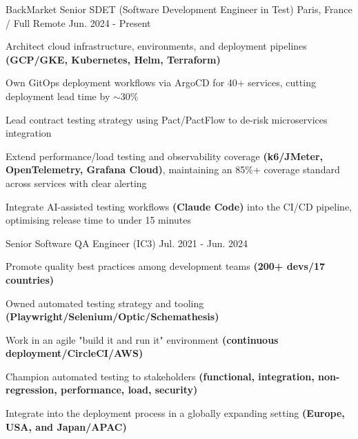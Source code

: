 
\begin{cventries}

  \cventry
  {BackMarket }
  {Senior SDET (Software Development Engineer in Test)}
  {Paris, France / Full Remote}
  {Jun. 2024 - Present}
  {
    \begin{cvitems}
      \item{Architect cloud infrastructure, environments, and deployment pipelines \textbf{(GCP/GKE, Kubernetes, Helm, Terraform)}}
      \item{Own GitOps deployment workflows via ArgoCD for 40+ services, cutting deployment lead time by $\sim$30\%}
      \item{Lead contract testing strategy using Pact/PactFlow to de-risk microservices integration}
      \item{Extend performance/load testing and observability coverage \textbf{(k6/JMeter, OpenTelemetry, Grafana Cloud)}, maintaining an 85\%+ coverage standard across services with clear alerting}
      \item{Integrate AI-assisted testing workflows \textbf{(Claude Code)} into the CI/CD pipeline, optimising release time to under 15 minutes}
    \end{cvitems}
    \vspace{0.75em}
  }

  \cventry
  {}
  {Senior Software QA Engineer (IC3)}
  {}
  {Jul. 2021 - Jun. 2024}
  {
    \begin{cvitems}
      \item{Promote quality best practices among development teams \textbf{(200+ devs/17 countries)}}
      \item{Owned automated testing strategy and tooling \textbf{(Playwright/Selenium/Optic/Schemathesis)}}
      \item{Work in an agile "build it and run it" environment \textbf{(continuous deployment/CircleCI/AWS)}}
      \item{Champion automated testing to stakeholders \textbf{(functional, integration, non-regression, performance, load, security)}}
      \item{Integrate into the deployment process in a globally expanding setting \textbf{(Europe, USA, and Japan/APAC)}}
    \end{cvitems}
    \vspace{0.75em}
  }


\end{cventries}
